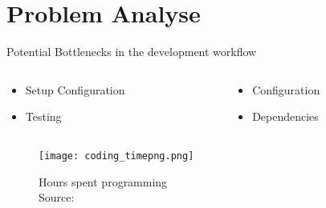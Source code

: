\documentclass{beamer}
\begin{document}
\section{Problem Analyse}
\begin{frame}{}
  \begin{center}
    Potential Bottlenecks in the development workflow
    \vspace{0.5cm}
    \begin{columns}[totalwidth=\textwidth]
      \begin{column}{0.4\textwidth}
        \begin{itemize}
          \item Setup Configuration
          \item Testing
        \end{itemize}
      \end{column}
      \begin{column}{0.4\textwidth}
        \begin{itemize}
          \item Configuration
          \item Dependencies
        \end{itemize}
      \end{column}
    \end{columns}
  \end{center}
  \begin{figure}
    \texttt{[image: coding\_timepng.png]}
    \caption{\footnotesize Hours spent programming \\\textcolor{uos-grey-full}{Source: {\cite{setuppain}}}}
  \end{figure}
\end{frame}

\end{document}
